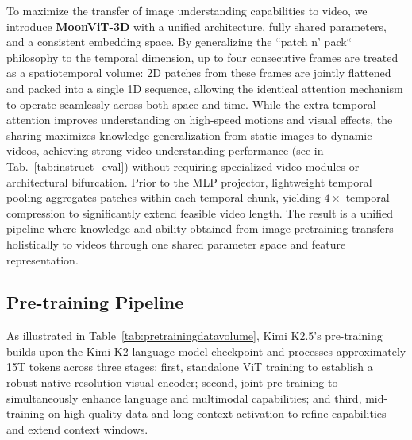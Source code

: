 To maximize the transfer of image understanding capabilities to video, we introduce \textbf{MoonViT-3D} with a unified architecture, fully shared parameters, and a consistent embedding space. By generalizing the ``patch n' pack`` philosophy to the temporal dimension, up to four consecutive frames are treated as a spatiotemporal volume: 2D patches from these frames are jointly flattened and packed into a single 1D sequence, allowing the identical attention mechanism to operate seamlessly across both space and time. While the extra temporal attention improves understanding on high-speed motions and visual effects, the sharing maximizes knowledge generalization from static images to dynamic videos, achieving strong video understanding performance (see in Tab.~\ref{tab:instruct_eval}) without requiring specialized video modules or architectural bifurcation. Prior to the MLP projector, lightweight temporal pooling aggregates patches within each temporal chunk, yielding $4\times$ temporal compression to significantly extend feasible video length. The result is a unified pipeline where knowledge and ability obtained from image pretraining transfers holistically to videos through one shared parameter space and feature representation.













\subsection{Pre-training Pipeline}

As illustrated in Table~\ref{tab:pretrainingdatavolume}, Kimi K2.5's pre-training builds upon the Kimi K2 language model checkpoint and processes approximately 15T tokens across three stages: first, standalone ViT training to establish a robust native-resolution visual encoder; second, joint pre-training to simultaneously enhance language and multimodal capabilities; and third, mid-training on high-quality data and long-context activation to refine capabilities and extend context windows.




